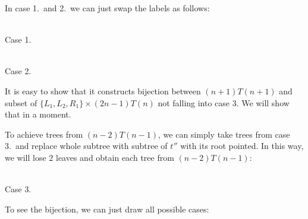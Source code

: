 \documentclass[final]{article}
\theoremstyle{definition}
\theoremstyle{definition}
\theoremstyle{remark}
\begin{document}
In case 1.\ and 2.\ we can just swap the labels as follows:

\begin{center}
    \begin{minipage}[t]{.3\textwidth}
        \begin{center}
            \\
            Case 1.
        \end{center}
    \end{minipage}%
    \begin{minipage}[t]{.3\textwidth}
        \begin{center}
            \\
            Case 2.
        \end{center}
    \end{minipage}%
\end{center}

It is easy to show that it constructs bijection between \((n + 1) T(n + 1)\) and subset of \(\{L_1, L_2, R_1\} \times (2 n - 1) T(n)\) not falling into case 3. We will show that in a moment.

To achieve trees from \((n - 2) T(n - 1)\), we can simply take trees from case 3.\ and replace whole subtree with subtree of \(t''\) with its root pointed. In this way, we will lose \(2\) leaves and obtain each tree from \((n - 2) T(n - 1)\):

\begin{center}
    \begin{minipage}[t]{.3\textwidth}
        \begin{center}
            \\
            Case 3.
        \end{center}
    \end{minipage}%
\end{center}

To see the bijection, we can just draw all possible cases:
\end{document}
